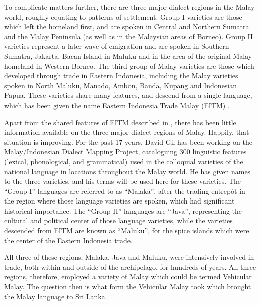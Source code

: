 To complicate matters further, there are three major dialect regions in the Malay world, roughly equating to patterns of settlement. Group I varieties are those which left the homeland first, and are spoken in Central and Northern Sumatra and the Malay Peninsula (as well as in the Malaysian areas of Borneo). Group II varieties represent a later wave of emigration and are spoken in Southern Sumatra, Jakarta, Bacan Island in Maluku and in the area of the original Malay homeland in Western Borneo. The third group of Malay varieties are those which developed through trade in Eastern Indonesia, including the Malay varieties spoken in North Maluku, Manado, Ambon, Banda, Kupang and Indonesian Papua. These varieties share many features, and descend from a single language, which has been given the name Eastern Indonesia Trade Malay (EITM) \citep[298]{Paauw2008}.

Apart from the shared features of EITM described in \citet{Paauw2008}, there has been little information available on the three major dialect regions of Malay. Happily, that situation is improving. For the past 17 years, David Gil has been working on the Malay/Indonesian Dialect Mapping Project, cataloguing 300 linguistic features (lexical, phonological, and grammatical) used in the colloquial varieties of the national language in locations throughout the Malay world. He has given names to the three varieties, and his terms will be used here for these varieties. The ``Group I'' languages are referred to as ``Malaka'', after the trading entrep\^ot in the region where those language varieties are spoken, which had significant historical importance. The ``Group II'' languages are ``Java'', representing the cultural and political center of those language varieties, while the varieties descended from EITM are known as ``Maluku'', for the spice islands which were the center of the Eastern Indonesia trade.

All three of these regions, Malaka, Java and Maluku, were intensively involved in trade, both within and outside of the archipelago, for hundreds of years. All three regions, therefore, employed a variety of Malay which could be termed Vehicular Malay. The question then is what form the Vehicular Malay took which brought the Malay language to Sri Lanka.

